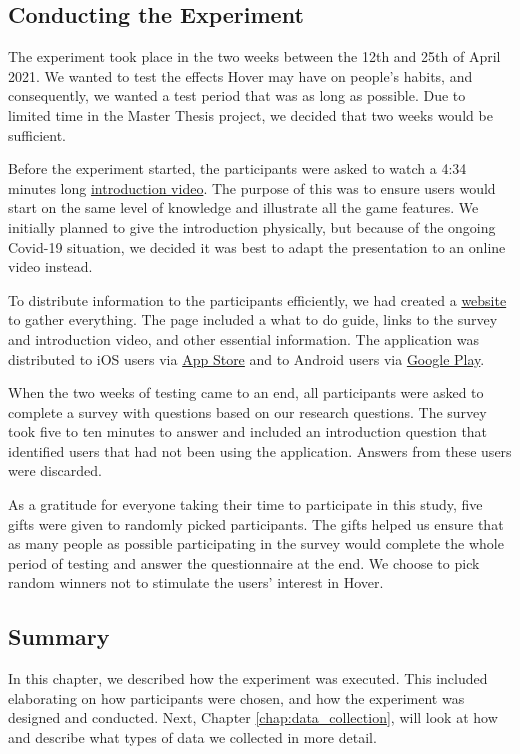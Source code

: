 \subsection{Conducting the Experiment}
The experiment took place in the two weeks between the 12th and 25th of April 2021. We wanted to test the effects Hover may have on people’s habits, and consequently, we wanted a test period that was as long as possible. Due to limited time in the Master Thesis project, we decided that two weeks would be sufficient. 

Before the experiment started, the participants were asked to watch a 4:34 minutes long \href{https://youtu.be/vx7aeTkt_aY}{introduction video}. The purpose of this was to ensure users would start on the same level of knowledge and illustrate all the game features. We initially planned to give the introduction physically, but because of the ongoing Covid-19 situation, we decided it was best to adapt the presentation to an online video instead.

To distribute information to the participants efficiently, we had created a \href{https://hover-game.web.app/testing/en}{website} to gather everything. The page included a what to do guide, links to the survey and introduction video, and other essential information. The application was distributed to iOS users via \href{https://apps.apple.com/no/app/hover/id1556425356}{App Store} and to Android users via \href{https://play.google.com/store/apps/details?id=com.hoverapp.hover}{Google Play}.

When the two weeks of testing came to an end, all participants were asked to complete a survey with questions based on our research questions. The survey took five to ten minutes to answer and included an introduction question that identified users that had not been using the application. Answers from these users were discarded.

As a gratitude for everyone taking their time to participate in this study, five gifts were given to randomly picked participants. The gifts helped us ensure that as many people as possible participating in the survey would complete the whole period of testing and answer the questionnaire at the end. We choose to pick random winners not to stimulate the users’ interest in Hover.

\subsection{Summary}
In this chapter, we described how the experiment was executed. This included elaborating on how participants were chosen, and how the experiment was designed and conducted. Next, Chapter \ref{chap:data_collection}, will look at how and describe what types of data we collected in more detail.
